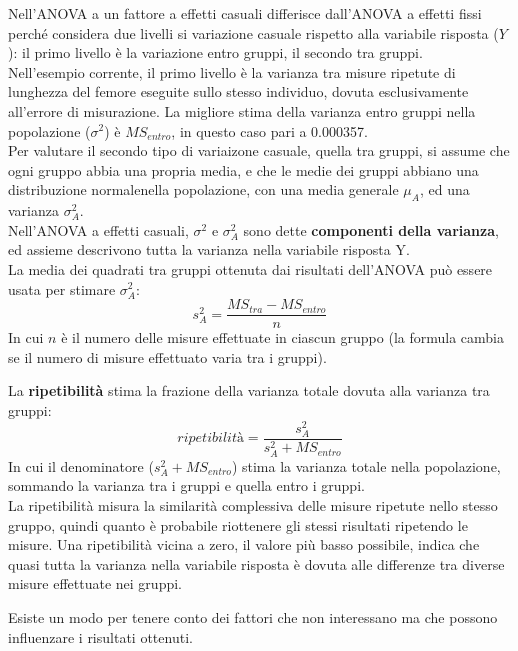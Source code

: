 \documentclass[10pt, draft]{book}
\newcounter{example}[section]
\begin{document}
\begin{example}
    Nell'ANOVA a un fattore a effetti casuali differisce dall'ANOVA a effetti fissi perché considera due livelli si variazione casuale rispetto alla variabile risposta ($Y$): il primo livello è la variazione entro gruppi, il secondo tra gruppi.\\
    Nell'esempio corrente, il primo livello è la varianza tra misure ripetute di lunghezza del femore eseguite sullo stesso individuo, dovuta esclusivamente all'errore di misurazione. La migliore stima della varianza entro gruppi nella popolazione ($\sigma^2$) è $MS_{entro}$, in questo caso pari a 0.000357.\\
    Per valutare il secondo tipo di variaizone casuale, quella tra gruppi, si assume che ogni gruppo abbia una propria media, e che le medie dei gruppi abbiano una distribuzione normalenella popolazione, con una media generale $\mu_A$, ed una varianza $\sigma^2_A$.\\
    Nell'ANOVA a effetti casuali, $\sigma^2$ e $\sigma^2_A$ sono dette \textbf{componenti della varianza}, ed assieme descrivono tutta la varianza nella variabile risposta Y.\\
    La media dei quadrati tra gruppi ottenuta dai risultati dell'ANOVA può essere usata per stimare $\sigma^2_A$:
    \begin{equation}
        s^2_A = \frac{MS_{tra}-MS_{entro}}{n}
    \end{equation}
    In cui $n$ è il numero delle misure effettuate in ciascun gruppo (la formula cambia se il numero di misure effettuato varia tra i gruppi).

    La \textbf{ripetibilità} stima la frazione della varianza totale dovuta alla varianza tra gruppi:
    \begin{equation}
        ripetibilità = \frac{s^2_A}{s^2_A+MS_{entro}}
    \end{equation}
    In cui il denominatore ($s^2_A+MS_{entro}$) stima la varianza totale nella popolazione, sommando la varianza tra i gruppi e quella entro i gruppi.\\
    La ripetibilità misura la similarità complessiva delle misure ripetute nello stesso gruppo, quindi quanto è probabile riottenere gli stessi risultati ripetendo le misure. Una ripetibilità vicina a zero, il valore più basso possibile, indica che quasi tutta la varianza nella variabile risposta è dovuta alle differenze tra diverse misure effettuate nei gruppi.
\end{example}

Esiste un modo per tenere conto dei fattori che non interessano ma che possono influenzare i risultati ottenuti. 
\end{document}
